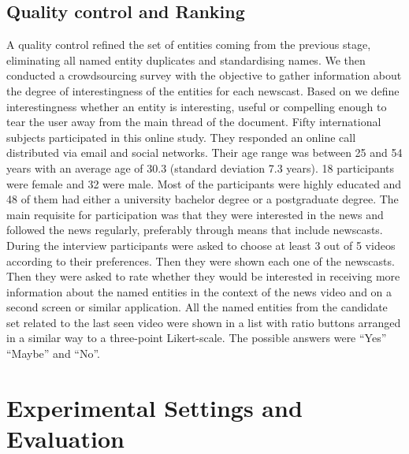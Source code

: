 \documentclass{llncs}
\newcommand{\todo}[1]{\colorbox{red}{#1}}
\begin{document}
\subsection{Quality control and Ranking}
A quality control refined the set of entities coming from the previous stage, eliminating all named entity duplicates and standardising names. 
We then conducted a crowdsourcing survey with the objective to gather information about the degree of interestingness of the entities for each newscast. Based on \cite{vonBrzeski:2007:LCU:1321440.1321537} we define interestingness whether an entity is interesting, useful or compelling enough to tear the user away from the main thread of the document. Fifty international subjects participated in this online study. They responded an online call distributed via email and social networks. Their age range was between 25 and 54 years with an average age of 30.3 (standard deviation 7.3 years). 18 participants were female and 32 were male. Most of the participants were highly educated and 48 of them had either a university bachelor degree or a postgraduate degree. The main requisite for participation was that they were interested in the news and followed the news regularly, preferably through means that include newscasts.
During the interview participants were asked to choose at least 3 out of 5 videos according to their preferences. Then they were shown each one of the newscasts. Then they were asked to rate whether they would be interested in receiving more information about the named entities in the context of the news video and on a second screen or similar application. All the named entities from the candidate set related to the last seen video were shown in a list with ratio buttons arranged in a similar way to a three-point Likert-scale. The possible answers were ``Yes'' ``Maybe'' and ``No''. 


\section{Experimental Settings and Evaluation}
\label{sec:Evaluation}
\end{document}
